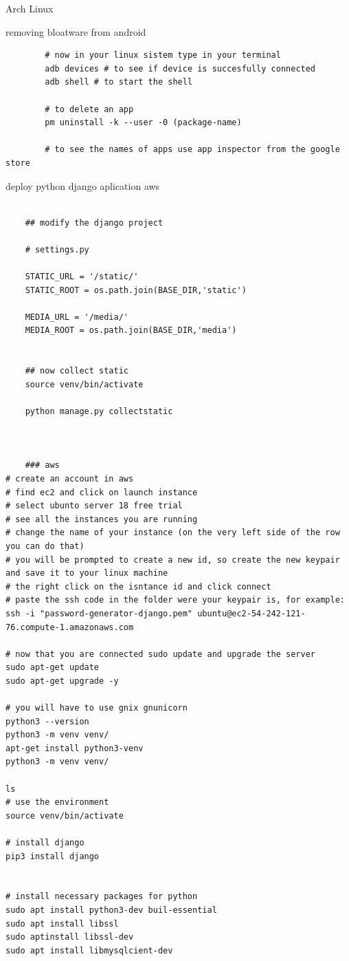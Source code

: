 \begin{section}{Arch Linux}
\begin{subsection}{removing bloatware from android}
\begin{verbatim}
		# now in your linux sistem type in your terminal
		adb devices # to see if device is succesfully connected
		adb shell # to start the shell

		# to delete an app
		pm uninstall -k --user -0 (package-name)

		# to see the names of apps use app inspector from the google store
		\end{verbatim}




\end{subsection}
\begin{subsection}{deploy python django aplication aws}
\begin{verbatim}

	## modify the django project

	# settings.py

	STATIC_URL = '/static/'
	STATIC_ROOT = os.path.join(BASE_DIR,'static')

	MEDIA_URL = '/media/'
	MEDIA_ROOT = os.path.join(BASE_DIR,'media')


	## now collect static
	source venv/bin/activate

	python manage.py collectstatic



	### aws
# create an account in aws
# find ec2 and click on launch instance
# select ubunto server 18 free trial
# see all the instances you are running
# change the name of your instance (on the very left side of the row you can do that)
# you will be prompted to create a new id, so create the new keypair and save it to your linux machine
# the right click on the isntance id and click connect
# paste the ssh code in the folder were your keypair is, for example:
ssh -i "password-generator-django.pem" ubuntu@ec2-54-242-121-76.compute-1.amazonaws.com

# now that you are connected sudo update and upgrade the server
sudo apt-get update
sudo apt-get upgrade -y

# you will have to use gnix gnunicorn
python3 --version
python3 -m venv venv/
apt-get install python3-venv
python3 -m venv venv/

ls
# use the environment
source venv/bin/activate

# install django 
pip3 install django


# install necessary packages for python
sudo apt install python3-dev buil-essential 
sudo apt install libssl
sudo aptinstall libssl-dev
sudo apt install libmysqlcient-dev



\end{verbatim}
\end{subsection}
\end{section}
